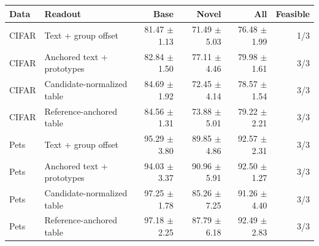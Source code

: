 \begin{tabular}{llrrrr}
\toprule
Data & Readout & Base & Novel & All & Feasible \\
\midrule
CIFAR & Text + group offset & 81.47 $\pm$ 1.13 & 71.49 $\pm$ 5.03 & 76.48 $\pm$ 1.99 & 1/3 \\
CIFAR & Anchored text + prototypes & 82.84 $\pm$ 1.50 & 77.11 $\pm$ 4.46 & 79.98 $\pm$ 1.61 & 3/3 \\
CIFAR & Candidate-normalized table & 84.69 $\pm$ 1.92 & 72.45 $\pm$ 4.14 & 78.57 $\pm$ 1.54 & 3/3 \\
CIFAR & Reference-anchored table & 84.56 $\pm$ 1.31 & 73.88 $\pm$ 5.01 & 79.22 $\pm$ 2.21 & 3/3 \\
Pets & Text + group offset & 95.29 $\pm$ 3.80 & 89.85 $\pm$ 4.86 & 92.57 $\pm$ 2.31 & 3/3 \\
Pets & Anchored text + prototypes & 94.03 $\pm$ 3.37 & 90.96 $\pm$ 5.91 & 92.50 $\pm$ 1.27 & 3/3 \\
Pets & Candidate-normalized table & 97.25 $\pm$ 1.78 & 85.26 $\pm$ 7.25 & 91.26 $\pm$ 4.40 & 3/3 \\
Pets & Reference-anchored table & 97.18 $\pm$ 2.25 & 87.79 $\pm$ 6.18 & 92.49 $\pm$ 2.83 & 3/3 \\
\bottomrule
\end{tabular}